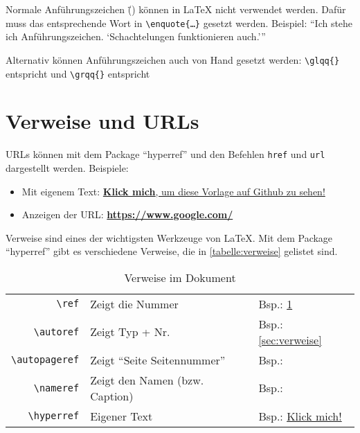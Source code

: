 Normale Anführungszeichen (\"{}) können in \LaTeX{} nicht verwendet werden. Dafür muss das entsprechende Wort in \texttt{\textbackslash enquote{\{\ldots\}}} gesetzt werden. Beispiel: \enquote{Ich stehe ich Anführungszeichen. \enquote{Schachtelungen funktionieren auch.}}

Alternativ können Anführungszeichen auch von Hand gesetzt werden:
\texttt{\textbackslash glqq\{\}} entspricht \glqq{} und \texttt{\textbackslash grqq\{\}} entspricht \grqq{}

\section{Verweise und URLs}\label{sec:verweise}
URLs können mit dem Package \enquote{hyperref} und den Befehlen \texttt{href} und \texttt{url} dargestellt werden. Beispiele:

\begin{itemize}
	\item Mit eigenem Text: \href{https://github.wdf.sap.corp/vtgermany/LaTeX-Template-DHBW/}{\textbf{Klick mich}, um diese Vorlage auf Github zu sehen!}
	\item Anzeigen der URL: \textbf{\url{https://www.google.com/}}
\end{itemize}

Verweise sind eines der wichtigsten Werkzeuge von \LaTeX. Mit dem Package \enquote{hyperref} gibt es verschiedene Verweise, die in \autoref{tabelle:verweise} gelistet sind.

\begin{table}[ht]
	\centering
	\begin{tabular}{rll}
		        \texttt{\textbackslash ref} & Zeigt die Nummer                   & Bsp.: \ref{sec:verweise}                   \\
		    \texttt{\textbackslash autoref} & Zeigt Typ + Nr.                    & Bsp.: \autoref{sec:verweise}               \\
		\texttt{\textbackslash autopageref} & Zeigt \enquote{Seite Seitennummer} & Bsp.: \autopageref{sec:verweise}           \\
		    \texttt{\textbackslash nameref} & Zeigt den Namen (bzw. Caption)     & Bsp.: \nameref{sec:verweise}               \\
		   \texttt{\textbackslash hyperref} & Eigener Text                       & Bsp.: \hyperref[sec:verweise]{Klick mich!}
	\end{tabular}
	\caption{Verweise im Dokument}
	\label{tabelle:verweise}
\end{table}

